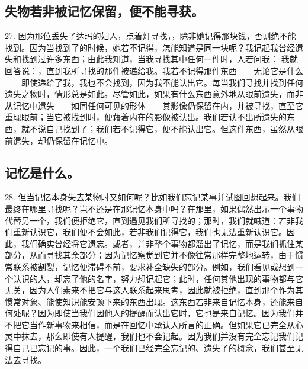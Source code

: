 
\subsection{失物若非被记忆保留，便不能寻获。}

27. 因为那位丢失了达玛的妇人，点着灯寻找，，除非她记得那块钱，否则绝不能找到。因为当找到了的时候，她若不记得，怎能知道是同一块呢？我记起我曾经遗失和找到过许多东西；由此我知道，当我寻找其中任何一件时，人若问我：  我就回答说：，直到我所寻找的那件被递给我。我若不记得那件东西——无论它是什么——即使递给了我，我也不会找到，因为我不能认出它。每当我们寻找并找到任何遗失之物时，情形总是如此。尽管如此，如果有什么东西意外地从眼前遗失，而非从记忆中遗失——如同任何可见的形体——其影像仍保留在内，并被寻找，直至它重现眼前；当它被找到时，便藉着内在的影像被认出。我们若认不出所遗失的东西，就不说自己找到了；我们若不记得它，便不能认出它。但这件东西，虽然从眼前遗失，却仍保留在记忆中。\par


\subsection{记忆是什么。}

28. 但当记忆本身失去某物时又如何呢？比如我们忘记某事并试图回想起来。我们最终在哪里寻找呢？岂不还是在那记忆本身中吗？在那里，如果偶然出示一个事物代替另一个，我们便拒绝它，直到遇见我们所寻找的；那时，我们就喊道：若非我们重新认识它，我们便不会如此，若非我们记得它，我们也无法重新认识它。因此，我们确实曾经将它遗忘。或者，并非整个事物都溜出了记忆，而是我们抓住某部分，从而寻找其余部分；因为记忆察觉到它并不像往常那样完整地运转，由于惯常联系被割裂，记忆便滞碍不前，要求补全缺失的部分。例如，我们看见或想到一个认识的人，却忘了他的名字，努力想记起它；此时，任何其他出现的事物都与它无关，因为人们素来不把它与这人联系起来思考，因此就被拒绝，直到那个作为其惯常对象、能使知识能安顿下来的东西出现。这东西若非来自记忆本身，还能来自何处呢？因为即使当我们因他人的提醒而认出它时，它也是来自记忆。因为我们并不把它当作新事物来相信，而是在回忆中承认人所言的正确。但如果它已完全从心灵中抹去，那么即使有人提醒，我们也不会记起。因为我们并没有完全忘记我们记得自己已忘记的事。因此，一个我们已经完全忘记的、遗失了的概念，我们甚至无法去寻找。\par

